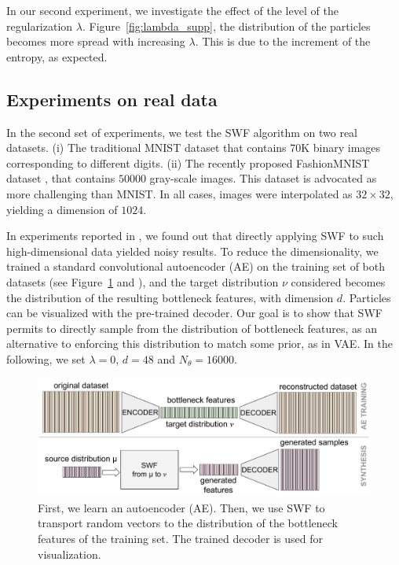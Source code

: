 

In our second experiment, we investigate the effect of the level of the regularization $\lambda$. Figure~\ref{fig:lambda_supp}, the distribution of the particles becomes more spread with increasing $\lambda$. This is due to the increment of the entropy, as expected.

\subsection{Experiments on real data}

In the second set of experiments, we test the SWF algorithm on two real datasets. (i) The traditional MNIST dataset that contains 70K binary images corresponding to different digits. (ii) The recently proposed FashionMNIST dataset \cite{xiao2017fashion}, that contains $50000$ gray-scale images. This dataset is advocated as more challenging than MNIST. In all cases, images were interpolated as $32\times 32$, yielding a dimension of $1024$.

In experiments reported in \supp, we found out that directly applying SWF to such high-dimensional data yielded noisy results. To reduce the dimensionality, we trained a standard convolutional autoencoder (AE) on the training set of both datasets (see Figure~\ref{fig:using_ae} and \supp), and the target distribution $\nu$ considered becomes the distribution of the resulting bottleneck features,
with dimension $d$. Particles can be visualized with the pre-trained decoder.
Our goal is to show that SWF permits to directly sample from the distribution of bottleneck features, as an alternative to enforcing this distribution to match some prior, as in VAE. In the following, we set $\lambda=0$, $d=48$ and $N_\theta=16000$.

\begin{figure}
\centering
\includegraphics[width=0.99\columnwidth]{figures/generating_bottleneck_features.pdf}
\caption{First, we learn an autoencoder (AE). Then, we use SWF to transport random vectors to the distribution of the bottleneck features of the training set. The trained decoder is used for visualization.}
\label{fig:using_ae}
\vspace{-10pt}
\end{figure}


